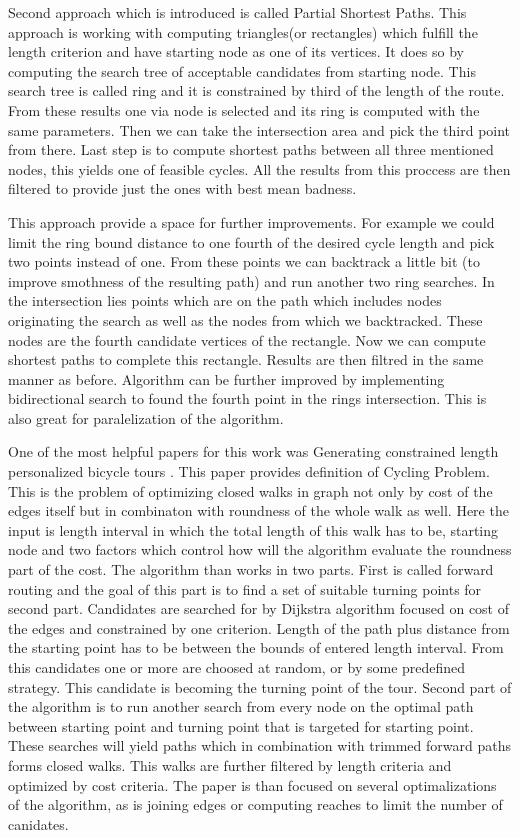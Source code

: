 \documentclass{ctuthesis}
\begin{document}
Second approach which is introduced is called Partial Shortest Paths. This approach is working with computing triangles(or rectangles) which fulfill the length criterion and have starting node as one of its vertices. It does so by computing the search tree of acceptable candidates from starting node. This search tree is called ring and it is constrained by third of the length of the route. From these results one via node is selected and its ring is computed with the same parameters. Then we can take the intersection area and pick the third point from there. Last step is to compute shortest paths between all three mentioned nodes, this yields one of feasible cycles. All the results from this proccess are then filtered to provide just the ones with best mean badness. \par
This approach provide a space for further improvements. For example we could limit the ring bound distance to one fourth of the desired cycle length and pick two points instead of one. From these points we can backtrack a little bit (to improve smothness of the resulting path) and run another two ring searches. In the intersection lies points which are on the path which includes nodes originating the search as well as the nodes from which we backtracked. These nodes are the fourth candidate vertices of the rectangle. Now we can compute shortest paths to complete this rectangle. Results are then filtred in the same manner as before. Algorithm can be further improved by implementing bidirectional search to found the fourth point in the rings intersection. This is also great for paralelization of the algorithm. \par

One of the most helpful papers for this work was Generating constrained length personalized bicycle tours \cite{stroobant}. This paper provides definition of Cycling Problem. This is the problem of optimizing closed walks in graph not only by cost of the edges itself but in combinaton with roundness of the whole walk as well. Here the input is length interval in which the total length of this walk has to be, starting node and two factors which control how will the algorithm evaluate the roundness part of the cost. The algorithm than works in two parts. First is called forward routing and the goal of this part is to find a set of suitable turning points for second part. Candidates are searched for by Dijkstra algorithm focused on cost of the edges and constrained by one criterion. Length of the path plus distance from the starting point has to be between the bounds of entered length interval. From this candidates one or more are choosed at random, or by some predefined strategy. This candidate is becoming the turning point of the tour. Second part of the algorithm is to run another search from every node on the optimal path between starting point and turning point that is targeted for starting point. These searches will yield paths which in combination with trimmed forward paths forms closed walks. This walks are further filtered by length criteria and optimized by cost criteria. The paper is than focused on several optimalizations of the algorithm, as is joining edges or computing reaches to limit the number of canidates.
\end{document}
